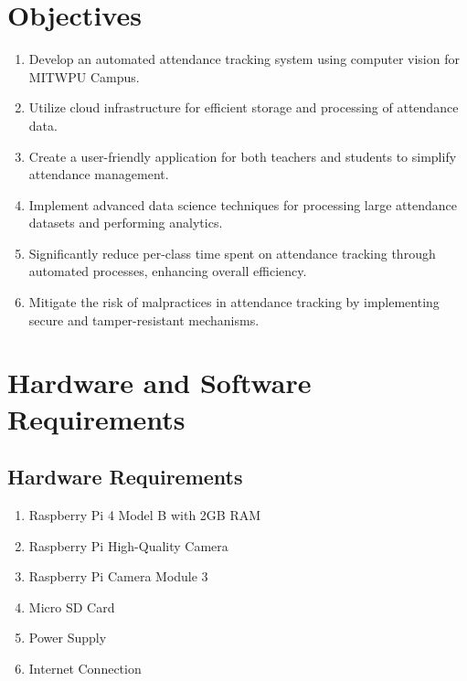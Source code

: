 \documentclass[11pt]{article}
\begin{document}
\begin{multicols}{2}
\section{Objectives}

\begin{enumerate}
    \item Develop an automated attendance tracking system using computer vision for MITWPU Campus.
    
    \item Utilize cloud infrastructure for efficient storage and processing of attendance data.

    \item Create a user-friendly application for both teachers and students to simplify attendance management.

    \item Implement advanced data science techniques for processing large attendance datasets and performing analytics.

    \item Significantly reduce per-class time spent on attendance tracking through automated processes, enhancing overall efficiency.

    \item Mitigate the risk of malpractices in attendance tracking by implementing secure and tamper-resistant mechanisms.
\end{enumerate}

\section{Hardware and Software Requirements}

\subsection{Hardware Requirements}
\begin{enumerate}
    \item Raspberry Pi 4 Model B with 2GB RAM
    \item Raspberry Pi High-Quality Camera
    \item Raspberry Pi Camera Module 3
    \item Micro SD Card
    \item Power Supply
    \item Internet Connection
    
\end{enumerate}
\end{multicols}
\end{document}
